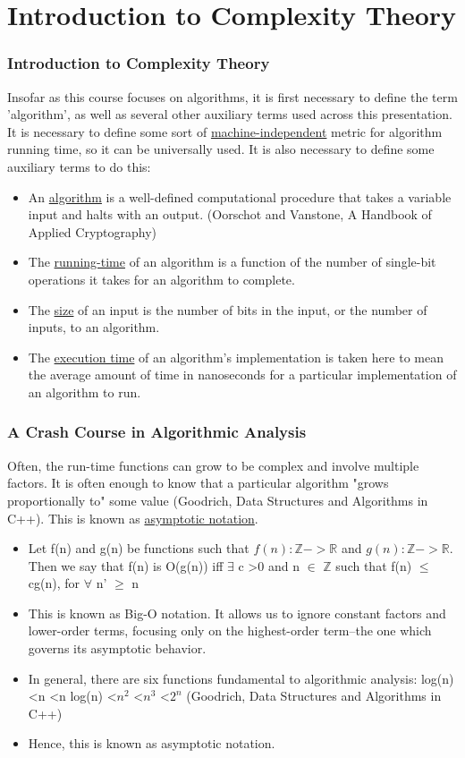 \documentclass[8pt]{beamer}
\begin{document}
\section{Introduction to Complexity Theory}
\begin{frame}
\frametitle{Introduction to Complexity Theory}
\indent Insofar as this course focuses on algorithms, it is first necessary to define the term 'algorithm', as well as several other auxiliary terms used across this presentation.
It is necessary to define some sort of \underline{machine-independent} metric for algorithm running time, so it can be universally used. It is also necessary to define some auxiliary terms to do this:
\begin{itemize}
\item An \underline{algorithm} is a well-defined computational procedure that takes a variable input and halts with an output. (Oorschot and Vanstone, A Handbook of Applied Cryptography)
\item The \underline{running-time} of an algorithm is a function of the number of single-bit operations it takes for an algorithm to complete. 
\item The \underline{size} of an input is the number of bits in the input, or the number of inputs, to an algorithm.
\item The \underline{execution time} of an algorithm's implementation is taken here to mean the average amount of time in nanoseconds for a particular implementation of an algorithm to run. 
\end{itemize}
\end{frame}
\begin{frame}
\frametitle{A Crash Course in Algorithmic Analysis}
\indent Often, the run-time functions can grow to be complex and involve multiple factors. It is often enough to know that a particular algorithm "grows proportionally to" some value (Goodrich, Data Structures and Algorithms in C++). This is known as \underline{asymptotic notation}. \\
\begin{itemize}
\item Let f(n) and g(n) be functions such that $f(n): \mathbb{Z}->\mathbb{R}$ and $g(n): \mathbb{Z}->\mathbb{R}$. Then we say that f(n) is O(g(n)) iff $\exists$ c \textgreater $0$ and n $\in$ $\mathbb{Z}$ such that 
f(n) $\leq$ cg(n), for $\forall$ n' $\geq$ n 
\item This is known as Big-O notation. It allows us to ignore constant factors and lower-order terms, focusing only on the highest-order term--the one which governs its asymptotic behavior.
\item In general, there are six functions fundamental to algorithmic analysis: log(n) \textless n \textless n log(n) \textless $n^2$ \textless $n^3$ \textless $2^n$ (Goodrich, Data Structures and Algorithms in C++)
\item Hence, this is known as asymptotic notation.
\end{itemize}
\end{frame}
\end{document}
